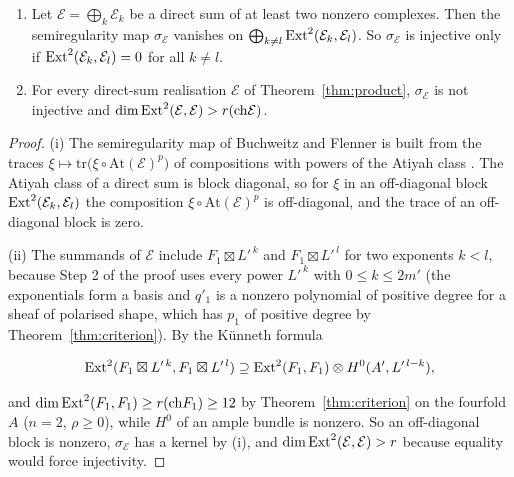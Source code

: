 \begin{proposition}\label{prop:directsum}
\leavevmode
\begin{enumerate}[label=\textup{(\roman*)},leftmargin=2.4em,itemsep=2pt]
\item Let $\mathcal{E}=\bigoplus_{k}\mathcal{E}_{k}$ be a direct sum of at least two nonzero complexes. Then the semiregularity map $\sigma_{\mathcal{E}}$ vanishes on $\bigoplus_{k\ne l}\mathrm{Ext}^{2}(\mathcal{E}_{k},\mathcal{E}_{l})$. So $\sigma_{\mathcal{E}}$ is injective only if $\mathrm{Ext}^{2}(\mathcal{E}_{k},\mathcal{E}_{l})=0$ for all $k\ne l$.
\item For every direct-sum realisation $\mathcal{E}$ of Theorem~\ref{thm:product}, $\sigma_{\mathcal{E}}$ is not injective and $\dim\mathrm{Ext}^{2}(\mathcal{E},\mathcal{E})>r(\mathrm{ch}\mathcal{E})$.
\end{enumerate}
\end{proposition}

\begin{proof}
(i) The semiregularity map of Buchweitz and Flenner is built from the traces $\xi\mapsto\mathrm{tr}\bigl(\xi\circ\mathrm{At}(\mathcal{E})^{p}\bigr)$ of compositions with powers of the Atiyah class \cite[Sect.~4]{BF03}. The Atiyah class of a direct sum is block diagonal, so for $\xi$ in an off-diagonal block $\mathrm{Ext}^{2}(\mathcal{E}_{k},\mathcal{E}_{l})$ the composition $\xi\circ\mathrm{At}(\mathcal{E})^{p}$ is off-diagonal, and the trace of an off-diagonal block is zero.

(ii) The summands of $\mathcal{E}$ include $F_{1}\boxtimes L'^{\,k}$ and $F_{1}\boxtimes L'^{\,l}$ for two exponents $k<l$, because Step 2 of the proof uses every power $L'^{\,k}$ with $0\le k\le2m'$ (the exponentials form a basis and $q'_{1}$ is a nonzero polynomial of positive degree for a sheaf of polarised shape, which has $p_{1}$ of positive degree by Theorem~\ref{thm:criterion}). By the K\"unneth formula
\begin{widetext}
\begin{equation}\label{eq:kunneth}
\mathrm{Ext}^{2}(F_{1}\boxtimes L'^{\,k},F_{1}\boxtimes L'^{\,l})\supseteq\mathrm{Ext}^{2}(F_{1},F_{1})\otimes H^{0}(A',L'^{\,l-k}),
\end{equation}
\end{widetext}
and $\dim\mathrm{Ext}^{2}(F_{1},F_{1})\ge r(\mathrm{ch} F_{1})\ge12$ by Theorem~\ref{thm:criterion} on the fourfold $A$ ($n=2$, $\rho\ge0$), while $H^{0}$ of an ample bundle is nonzero. So an off-diagonal block is nonzero, $\sigma_{\mathcal{E}}$ has a kernel by (i), and $\dim\mathrm{Ext}^{2}(\mathcal{E},\mathcal{E})>r$ because equality would force injectivity.
\end{proof}

